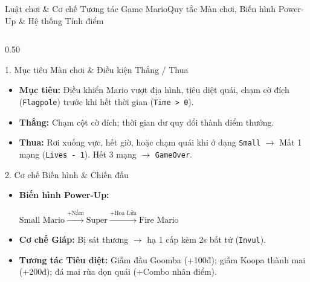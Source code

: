 \documentclass[aspectratio=169, 10pt]{beamer}
\begin{document}
\begin{frame}{Luật chơi \& Cơ chế Tương tác Game Mario}{Quy tắc Màn chơi, Biến hình Power-Up \& Hệ thống Tính điểm}
    \begin{columns}[T]
        \begin{column}{0.50\textwidth}
            \begin{coreCard}[top=2pt, bottom=2pt]{1. Mục tiêu Màn chơi \& Điều kiện Thắng / Thua}
                \begin{itemize}\scriptsize\setlength{\itemsep}{0.8pt}
                    \item \textbf{Mục tiêu:} Điều khiển Mario vượt địa hình, tiêu diệt quái, chạm cờ đích (\texttt{Flagpole}) trước khi hết thời gian (\texttt{Time > 0}).
                    \item \textbf{Thắng:} Chạm cột cờ đích; thời gian dư quy đổi thành điểm thưởng.
                    \item \textbf{Thua:} Rơi xuống vực, hết giờ, hoặc chạm quái khi ở dạng \texttt{Small} $\rightarrow$ Mất 1 mạng (\texttt{Lives - 1}). Hết 3 mạng $\rightarrow$ \texttt{GameOver}.
                \end{itemize}
            \end{coreCard}

            \begin{infoCard}[top=2pt, bottom=2pt]{2. Cơ chế Biến hình \& Chiến đấu}
                \begin{itemize}\scriptsize\setlength{\itemsep}{0.8pt}
                    \item \textbf{Biến hình Power-Up:} \\
                    \centerline{\small $\text{Small Mario} \xrightarrow{+\text{Nấm}} \text{Super} \xrightarrow{+\text{Hoa Lửa}} \text{Fire Mario}$}
                    \item \textbf{Cơ chế Giáp:} Bị sát thương $\rightarrow$ hạ 1 cấp kèm 2s bất tử (\texttt{Invul}).
                    \item \textbf{Tương tác Tiêu diệt:} Giẫm đầu Goomba (+100đ); giẫm Koopa thành mai (+200đ); đá mai rùa dọn quái (+Combo nhân điểm).
                \end{itemize}
            \end{infoCard}
        \end{column}


\end{columns}
\end{frame}
\end{document}
